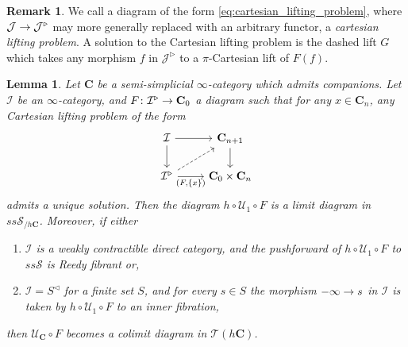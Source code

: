 \documentclass[10pt]{amsart}
\numberwithin{equation}{section}
\newtheorem{lem}[prop]{Lemma}
\theoremstyle{definition}
\newtheorem{rem}[prop]{Remark}
\newcommand{\cI}{\mathcal{I}}
\newcommand{\cJ}{\mathcal{J}}
\newcommand{\cS}{\mathcal{S}}
\newcommand{\cT}{\mathcal{T}}
\newcommand{\cU}{\mathcal{U}}
\newcommand{\bfC}{\mathbf{C}}
\renewcommand{\to}{\mathchoice{\longrightarrow}{\rightarrow}{}{}}
\begin{document}
	\begin{rem}
		We call a diagram of the form \eqref{eq:cartesian_lifting_problem}, where $\cJ \to \cJ^{\triangleright}$ may more generally replaced with an arbitrary functor, a \emph{cartesian lifting problem}.
    A solution to the Cartesian lifting problem is the dashed lift $G$ which takes any morphism $f$ in $\cJ^{\triangleright}$ to a $\pi$-Cartesian lift of $F(f)$.
	\end{rem}

	\begin{lem}\label{lem:companion_colim}
		Let $\bfC$ be a semi-simplicial $\infty$-category which admits companions. Let $\cI$ be an $\infty$-category, and $F\colon \cI^{\triangleright} \to \bfC_{0}$ a diagram such that for any $x\in \bfC_{n}$, any Cartesian lifting problem of the form
		\begin{equation*}
			\begin{tikzcd}
				\cI \arrow[r] \arrow[d]      &   \bfC_{n+1}  \arrow[d] \\
				\cI^{\triangleright}  \arrow[r, "{(F,\left\{ x\right\})}"']     \arrow[ur,dashed]       &   \bfC_{0} \times \bfC_{n}
			\end{tikzcd}
		\end{equation*}
		admits a unique solution.
    Then the diagram $h\circ \cU_{1}\circ F$ is a limit diagram in $ss\cS_{/h\bfC}$.
    Moreover, if either
		\begin{enumerate}
			\item $\cI$ is a weakly contractible direct category, and the pushforward of $h\circ\cU_{1} \circ F$ to $ss\cS$ is Reedy fibrant or,
			\item $\cI= S^{\triangleleft}$ for a finite set $S$, and for every $s\in S$ the morphism $-\infty \to s$ in $\cI$ is taken by $h\circ \cU_{1}\circ F$ to an inner fibration,
		\end{enumerate}
		then $\cU_{\bfC} \circ F$ becomes a colimit diagram in $\cT(h\bfC)$.
	\end{lem}
\end{document}
